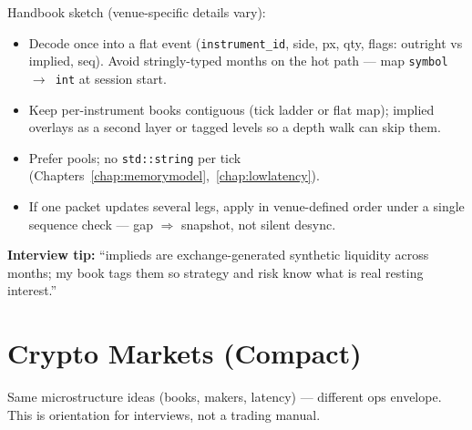 Handbook sketch (venue-specific details vary):
\begin{itemize}
    \item Decode once into a flat event (\texttt{instrument\_id}, side, px, qty, 
          flags: outright vs implied, seq). Avoid stringly-typed months on the hot 
          path --- map \texttt{symbol $\rightarrow$ int} at session start.
    \item Keep per-instrument books contiguous (tick ladder or flat map); implied 
          overlays as a second layer or tagged levels so a depth walk can skip them.
    \item Prefer  pools; no \texttt{std::string} per tick 
          (Chapters~\ref{chap:memorymodel},~\ref{chap:lowlatency}).
    \item If one packet updates several legs, apply in venue-defined order under a 
          single sequence check --- gap $\Rightarrow$ snapshot, not silent desync.
\end{itemize}
\par\noindent\textbf{Interview tip:} ``implieds are exchange-generated synthetic 
liquidity across months; my book tags them so strategy and risk know what is real 
resting interest.''

\section{Crypto Markets (Compact)}
\label{sec:crypto-markets}
Same microstructure ideas (books, makers, latency) --- different ops envelope. 
This is orientation for interviews, not a trading manual.

